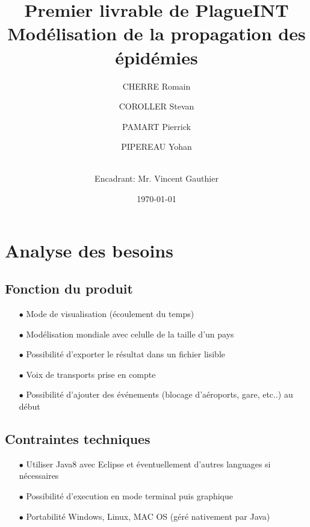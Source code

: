 \documentclass[12pt,a4paper]{report}
\title{ \Huge \textbf{Premier livrable de PlagueINT} \\ \large Modélisation de la propagation des épidémies}
\date{\today}
\author{
CHERRE Romain
\and COROLLER Stevan 
\and PAMART Pierrick
\and PIPEREAU Yohan
\and \\
Encadrant: Mr. Vincent Gauthier }
\begin{document}
\maketitle

\tableofcontents

\newpage

\section*{Analyse des besoins}

\subsection*{Fonction du produit}
\begin{flushleft}
  \begin{itemize}
	\item[$\bullet$] Mode de visualisation (écoulement du temps) 
	\item[$\bullet$] Modélisation mondiale avec celulle de la taille d'un pays
	\item[$\bullet$] Possibilité d'exporter le résultat dans un fichier lisible 
	\item[$\bullet$] Voix de transports prise en compte 
	\item[$\bullet$] Possibilité d'ajouter des événements (blocage d'aéroports, gare, etc..) au début
  \end{itemize}
\end{flushleft}

\subsection*{Contraintes techniques}
\begin{flushleft}
  \begin{itemize}
	\item[$\bullet$] Utiliser Java8 avec Eclipse et éventuellement d'autres languages si nécessaires 
	\item[$\bullet$] Possibilité d'execution en mode terminal puis graphique
	\item[$\bullet$] Portabilité Windows, Linux, MAC OS (géré nativement par Java)
    \end{itemize}
\end{flushleft}
\end{document}

